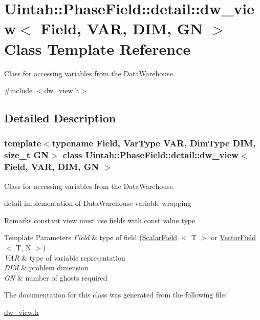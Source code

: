 \hypertarget{classUintah_1_1PhaseField_1_1detail_1_1dw__view}{}\section{Uintah\+:\+:Phase\+Field\+:\+:detail\+:\+:dw\+\_\+view$<$ Field, V\+AR, D\+IM, GN $>$ Class Template Reference}
\label{classUintah_1_1PhaseField_1_1detail_1_1dw__view}


Class for accessing variables from the Data\+Warehouse.  




{\ttfamily \#include $<$dw\+\_\+view.\+h$>$}



\subsection{Detailed Description}
\subsubsection*{template$<$typename Field, Var\+Type V\+AR, Dim\+Type D\+IM, size\+\_\+t GN$>$\newline
class Uintah\+::\+Phase\+Field\+::detail\+::dw\+\_\+view$<$ Field, V\+A\+R, D\+I\+M, G\+N $>$}

Class for accessing variables from the Data\+Warehouse. 

detail implementation of Data\+Warehouse variable wrapping

\begin{DoxyRemark}{Remarks}
constant view must use fields with const value type
\end{DoxyRemark}

\begin{DoxyTemplParams}{Template Parameters}
{\em Field} & type of field (\hyperlink{structUintah_1_1PhaseField_1_1ScalarField}{Scalar\+Field} $<$ T $>$ or \hyperlink{structUintah_1_1PhaseField_1_1VectorField}{Vector\+Field} $<$ T, N $>$) \\
\hline
{\em V\+AR} & type of variable representation \\
\hline
{\em D\+IM} & problem dimension \\
\hline
{\em GN} & number of ghosts required \\
\hline
\end{DoxyTemplParams}


The documentation for this class was generated from the following file\+:\begin{DoxyCompactItemize}
\item 
\hyperlink{dw__view_8h}{dw\+\_\+view.\+h}\end{DoxyCompactItemize}
